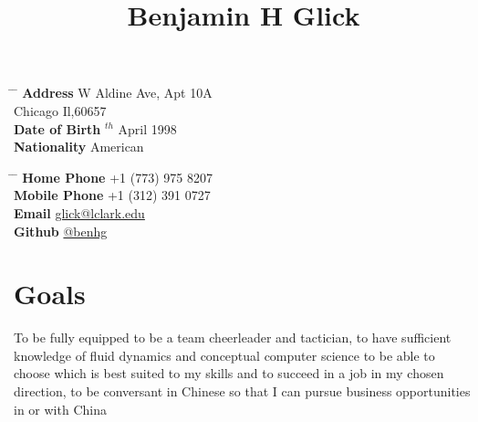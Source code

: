 \documentclass[10pt]{article} %
\begin{document}

\title{Benjamin H Glick} %


\parbox{0.5\textwidth}{ %
\begin{tabbing} %
\hspace{3cm} \= \hspace{4cm} \= \kill %
{\bf Address}  W Aldine Ave, Apt 10A\\ %
\>Chicago Il,60657  \\ %
{\bf Date of Birth} $^{th}$ April 1998 \\ %
{\bf Nationality} \> American %
\end{tabbing}}
\hfill %
\parbox{0.5\textwidth}{ %
\begin{tabbing} %
\hspace{3cm} \= \hspace{4cm} \= \kill %
{\bf Home Phone} \> +1 (773) 975 8207 \\ %
{\bf Mobile Phone} \> +1 (312) 391 0727 \\ %
{\bf Email} \> \href{mailto:glick@lclark.edu}{glick@lclark.edu} \\ %
{\bf Github} \> \href{https://github.com/benhg}{@benhg} \\ %
\end{tabbing}}


\section{Goals}

{To be fully equipped to be a team cheerleader and tactician, to have sufficient knowledge of fluid dynamics and conceptual computer science to be able to choose which is best suited to my skills and to succeed in a job in my chosen direction, to be conversant in Chinese so that I can pursue business opportunities in or with China}
\end{document}
